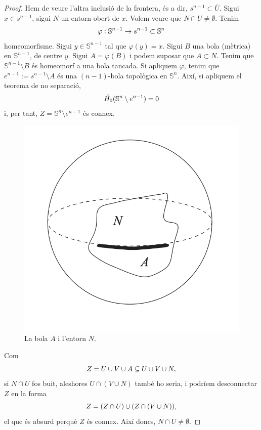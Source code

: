 \documentclass[../main.tex]{subfiles}
\begin{document}
\begin{proof}
Hem de veure l'altra inclusió de la frontera, és a dir, $s^{n-1}\subset\overline{U}$. Sigui $x\in s^{n-1}$, sigui $N$ un entorn obert de $x$. Volem veure que $N\cap U\not=\emptyset$. Tenim
\begin{equation}
    \notag
    \varphi:\mathbb{S}^{n-1}\rightarrow s^{n-1}\subset\mathbb{S}^{n}
\end{equation}
homeomorfisme. Sigui $y\in \mathbb{S}^{n-1}$ tal que $\varphi(y)=x$. Sigui $B$ una bola (mètrica) en $\mathbb{S}^{n-1}$, de centre $y$. Sigui $A = \varphi(B)$ i podem suposar que $A\subset N$. Tenim que $\mathbb{S}^{n-1}\setminus B$ és homeomorf a una bola tancada. Si apliquem $\varphi$, tenim que $e^{n-1}:= s^{n-1}\setminus A$ és una $(n-1)$-bola topològica en $\mathbb{S}^n$. Així, si apliquem el teorema de no separació,
\begin{equation}
    \notag
    \Tilde{H_0}(\mathbb{S}^n\setminus e^{n-1}) = 0
\end{equation}
i, per tant, $Z = \mathbb{S}^n\setminus e^{n-1}$ és connex. 
\begin{figure}
    \centering
    \includegraphics[scale = 0.5]{pictures/jordanbrouwer.png}
    \caption{La bola $A$ i l'entorn $N$.}
    \label{fig:bolaaentornn}
\end{figure}
Com 
\begin{equation}
    \notag
    Z = U\cup V\cup A\subseteq U\cup V\cup N,
\end{equation}
si $N\cap U$ fos buit, aleshores $U\cap(V\cup N)$ també ho seria, i podríem desconnectar $Z$ en la forma
\begin{equation}
    \notag
    Z=(Z\cap U)\cup(Z\cap(V\cup N)),
\end{equation}
el que és absurd perquè $Z$ és connex. Així doncs, $N\cap U\not=\emptyset$.
\end{proof}
\end{document}
